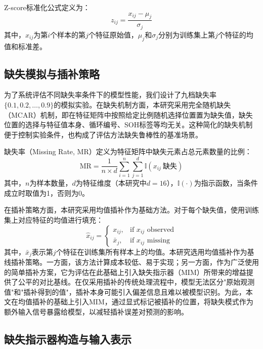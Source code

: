 \documentclass[10pt,a4paper]{ctexart}
\begin{document}
Z-score标准化公式定义为：
\begin{equation}
    z_{ij} = \frac{x_{ij} - \mu_j}{\sigma_j}
\end{equation}
其中，$x_{ij}$为第$i$个样本的第$j$个特征原始值，$\mu_j$和$\sigma_j$分别为训练集上第$j$个特征的均值和标准差。

\subsection{缺失模拟与插补策略}

为了系统评估不同缺失率条件下的模型性能，我们设计了九档缺失率$\{0.1, 0.2, \ldots, 0.9\}$的模拟实验。在缺失机制方面，本研究采用完全随机缺失（MCAR）机制，即在特征矩阵中按照给定比例随机选择位置置为缺失值，缺失位置的选择与特征值本身、循环编号、SOH标签等均无关。这种简化的缺失机制便于控制实验条件，也构成了评估方法缺失鲁棒性的基准场景。

缺失率（Missing Rate, MR）定义为特征矩阵中缺失元素占总元素数量的比例：
\begin{equation}
    \text{MR} = \frac{1}{n \times d} \sum_{i=1}^{n}\sum_{j=1}^{d} \mathbb{I}(x_{ij}\ \text{缺失})
    \label{eq:mr}
\end{equation}
其中，$n$为样本数量，$d$为特征维度（本研究中$d=16$），$\mathbb{I}(\cdot)$为指示函数，当条件成立时取值为1，否则为0。

在插补策略方面，本研究采用均值插补作为基础方法。对于每个缺失值，使用训练集上对应特征的均值进行填充：
\begin{equation}
    \hat{x}_{ij} = \begin{cases}
        x_{ij}, & \text{if } x_{ij} \text{ observed} \\
        \bar{x}_j, & \text{if } x_{ij} \text{ missing}
    \end{cases}
\end{equation}
其中，$\bar{x}_j$表示第$j$个特征在训练集所有样本上的均值。本研究选用均值插补作为基线插补策略。一方面，该方法计算成本较低、易于实现；另一方面，作为广泛使用的简单插补方案，它为评估在此基础上引入缺失指示器（MIM）所带来的增益提供了公平的对比基线。在仅采用插补的传统处理流程中，模型无法区分"原始观测值"和"插补得到的值"，插补本身可能引入偏差信息且难以被模型识别。为此，本文在均值插补的基础上引入MIM，通过显式标记被插补的位置，将缺失模式作为额外输入信号暴露给模型，以减轻插补误差对预测的影响。

\subsection{缺失指示器构造与输入表示}
\end{document}
